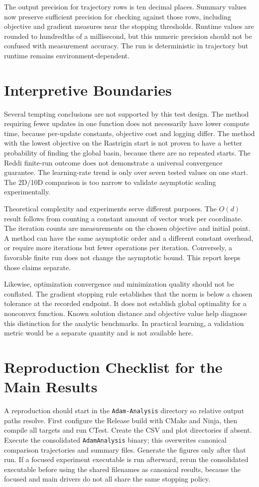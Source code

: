 \documentclass[conference]{IEEEtran}
\begin{document}
The output precision for trajectory rows is ten decimal places. Summary values now preserve sufficient precision for checking against those rows, including objective and gradient measures near the stopping thresholds. Runtime values are rounded to hundredths of a millisecond, but this numeric precision should not be confused with measurement accuracy. The run is deterministic in trajectory but runtime remains environment-dependent.
\section{Interpretive Boundaries}
Several tempting conclusions are not supported by this test design. The method requiring fewer updates in one function does not necessarily have lower compute time, because per-update constants, objective cost and logging differ. The method with the lowest objective on the Rastrigin start is not proven to have a better probability of finding the global basin, because there are no repeated starts. The Reddi finite-run outcome does not demonstrate a universal convergence guarantee. The learning-rate trend is only over seven tested values on one start. The 2D/10D comparison is too narrow to validate asymptotic scaling experimentally.

Theoretical complexity and experiments serve different purposes. The $O(d)$ result follows from counting a constant amount of vector work per coordinate. The iteration counts are measurements on the chosen objective and initial point. A method can have the same asymptotic order and a different constant overhead, or require more iterations but fewer operations per iteration. Conversely, a favorable finite run does not change the asymptotic bound. This report keeps those claims separate.

Likewise, optimization convergence and minimization quality should not be conflated. The gradient stopping rule establishes that the norm is below a chosen tolerance at the recorded endpoint. It does not establish global optimality for a nonconvex function. Known solution distance and objective value help diagnose this distinction for the analytic benchmarks. In practical learning, a validation metric would be a separate quantity and is not available here.
\section{Reproduction Checklist for the Main Results}
A reproduction should start in the \texttt{Adam-Analysis} directory so relative output paths resolve. First configure the Release build with CMake and Ninja, then compile all targets and run CTest. Create the CSV and plot directories if absent. Execute the consolidated \texttt{AdamAnalysis} binary; this overwrites canonical comparison trajectories and summary files. Generate the figures only after that run. If a focused experiment executable is run afterward, rerun the consolidated executable before using the shared filenames as canonical results, because the focused and main drivers do not all share the same stopping policy.
\end{document}
